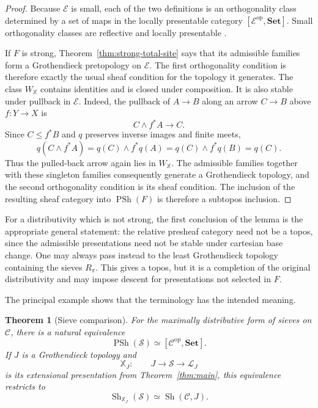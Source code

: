 \documentclass[12pt,oneside,reqno]{amsart}
\newtheorem{theorem}{Theorem}[section]
\theoremstyle{definition}
\theoremstyle{remark}
\newcommand{\C}{\mathcal C}
\newcommand{\Sieve}{\mathscr S}
\newcommand{\Sat}{\mathscr L}
\begin{document}
\begin{proof}
Because \(\mathcal E\) is small, each of the two definitions is an
orthogonality class determined by a set of maps in the locally presentable
category \([\mathcal E^{\mathrm{op}},\mathbf{Set}]\).  Small
orthogonality classes are reflective and locally presentable
\cite{AdamekRosicky}.

If \(F\) is strong, Theorem~\ref{thm:strong-total-site} says that its
admissible families form a Grothendieck pretopology on \(\mathcal E\).
The first orthogonality condition is therefore exactly the usual sheaf
condition for the topology it generates.  The class
\(W_{\mathbb X}\) contains identities and is closed under composition.
It is also stable under pullback in \(\mathcal E\).  Indeed, the pullback
of \(A\to B\) along an arrow \(C\to B\) above \(f:Y\to X\) is
\[
                       C\wedge f^*A\longrightarrow C.
\]
Since \(C\leqslant f^*B\) and \(q\) preserves inverse images and finite
meets,
\[
 q(C\wedge f^*A)
   =q(C)\wedge f^*q(A)
   =q(C)\wedge f^*q(B)
   =q(C).
\]
Thus the pulled-back arrow again lies in \(W_{\mathbb X}\).  The
admissible families together with these singleton families consequently
generate a Grothendieck topology, and the second orthogonality condition
is its sheaf condition.  The inclusion of the resulting sheaf category
into \(\operatorname{PSh}(F)\) is therefore a subtopos inclusion.
\end{proof}

For a distributivity which is not strong, the first conclusion of the
lemma is the appropriate general statement: the relative presheaf
category need not be a topos, since the admissible presentations need not
be stable under cartesian base change.  One may always pass instead to the
least Grothendieck topology containing the sieves \(R_\pi\).  This gives a
topos, but it is a completion of the original distributivity and may
impose descent for presentations not selected in \(F\).

The principal example shows that the terminology has the intended
meaning.

\begin{theorem}[Sieve comparison]\label{thm:relative-sieve-sheaves}
For the maximally distributive form of sieves on \(\C\), there is a
natural equivalence
\[
             \operatorname{PSh}(\Sieve)\simeq
             [\C^{\mathrm{op}},\mathbf{Set}].
\]
If \(J\) is a Grothendieck topology and
\[
             \mathbb X_J:\qquad
             J\longrightarrow\Sieve\longrightarrow\Sat_J
\]
is its extensional presentation from Theorem~\ref{thm:main}, this
equivalence restricts to
\[
             \operatorname{Sh}_{\mathbb X_J}(\Sieve)\simeq
             \operatorname{Sh}(\C,J).
\]
\end{theorem}
\end{document}

